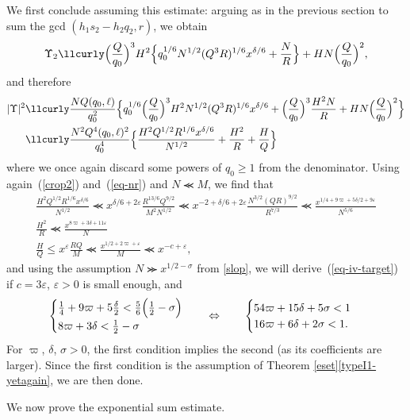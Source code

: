 \documentclass[12pt,a4paper,reqno]{amsart}
\numberwithin{equation}{section}
\theoremstyle{plain}
\theoremstyle{definition}
\newcommand\eps{\varepsilon}
\renewcommand{\lessapprox}{\llcurly}
\begin{document}
We first conclude assuming this estimate: arguing as in the previous
section to sum the gcd $(h_1s_2-h_2q_2,r)$, we obtain
$$
\Upsilon_2\lessapprox 
\Bigl(\frac{Q}{q_0}\Bigr)^3H^2
\Bigl\{
q_0^{1/6}N^{1/2}(Q^3R)^{1/6}x^{\delta/6}+\frac{N}{R}
\Bigr\}
+HN\Bigl(\frac{Q}{q_0}\Bigr)^2,
$$
and therefore
\begin{align*}
|\Upsilon|^2&
\lessapprox \frac{NQ(q_0,\ell)}{q_0^2}\Bigl\{
q_0^{1/6}\Bigl(\frac{Q}{q_0}\Bigr)^3H^2N^{1/2}(Q^3R)^{1/6}x^{\delta/6}+
\Bigl(\frac{Q}{q_0}\Bigr)^3\frac{H^2N}{R}+
HN\Bigl(\frac{Q}{q_0}\Bigr)^2
\Bigr\}\\
&\lessapprox \frac{N^2Q^4(q_0,\ell)^2}{q_0^4}
\Bigl\{
\frac{H^2Q^{1/2}R^{1/6}x^{\delta/6}}{N^{1/2}}+
\frac{H^2}{R}+\frac{H}{Q}
\Bigr\}
\end{align*}
where we once again discard some powers of $q_0 \geq 1$ from the denominator.
Using again~(\ref{crop2}) and~(\ref{eq-nr}) and $N\lessapprox M$, we
find that
\begin{gather*}
\frac{H^2Q^{1/2}R^{1/6}x^{\delta/6}}{N^{1/2}}\lessapprox
x^{\delta/6+2\eps}\frac{R^{13/6}Q^{9/2}}{M^2N^{1/2}}\lessapprox
x^{-2+\delta/6+2\eps}\frac{N^{3/2}(QR)^{9/2}}{R^{7/3}}
\lessapprox \frac{x^{1/4+9\varpi+5\delta/2+9\eps}}{N^{5/6}}
\\
\frac{H^2}{R}\lessapprox \frac{x^{8\varpi +3\delta+11\eps}}{N}\\
\frac{H}{Q}\leq x^{\eps}\frac{RQ}{M}\lessapprox
\frac{x^{1/2+2\varpi+\eps}}{M}
\lessapprox x^{-c+\eps},
\end{gather*}
and using the assumption $N\ggcurly x^{1/2-\sigma}$ from \eqref{slop}, we will
derive~(\ref{eq-iv-target}) if $c=3\eps$, $\eps>0$ is small enough,
and
$$
\begin{cases}
\frac{1}{4}+9\varpi+5\frac{\delta}{2}<\frac{5}{6}
\Bigl(\frac{1}{2}-\sigma\Bigr)\\
8\varpi+3\delta<\frac{1}{2}-\sigma
\end{cases}
\quad
\Leftrightarrow\quad\quad
\begin{cases}
54\varpi+15\delta+5\sigma<1\\
16\varpi+6\delta+2\sigma<1.
\end{cases}
$$
For $\varpi$, $\delta$, $\sigma>0$, the first condition implies the
second (as its coefficients are larger). Since the first
condition is the assumption of Theorem
\ref{eset}\eqref{typeI1-yetagain}, we are then done.

We now prove the exponential sum estimate.
\end{document}
